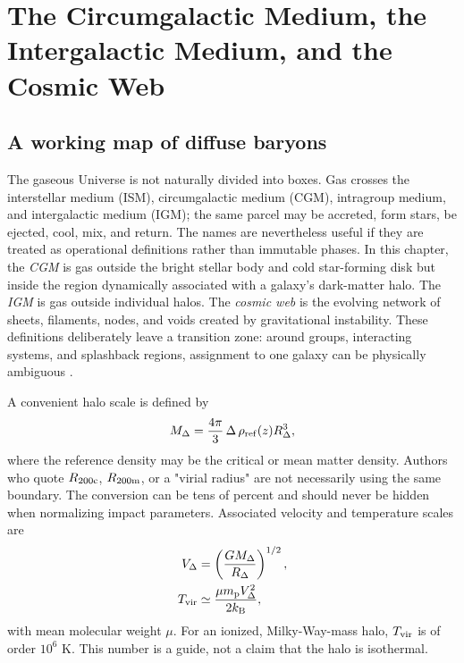 \chapter{The Circumgalactic Medium, the Intergalactic Medium, and the Cosmic Web}
\label{chap:cgm-igm}

\section{A working map of diffuse baryons}

The gaseous Universe is not naturally divided into boxes. Gas crosses the
interstellar medium (ISM), circumgalactic medium (CGM), intragroup medium, and
intergalactic medium (IGM); the same parcel may be accreted, form stars, be
ejected, cool, mix, and return. The names are nevertheless useful if they are
treated as operational definitions rather than immutable phases. In this
chapter, the \emph{CGM} is gas outside the bright stellar body and cold
star-forming disk but inside the region dynamically associated with a galaxy's
dark-matter halo. The \emph{IGM} is gas outside individual halos. The
\emph{cosmic web} is the evolving network of sheets, filaments, nodes, and
voids created by gravitational instability. These definitions deliberately
leave a transition zone: around groups, interacting systems, and splashback
regions, assignment to one galaxy can be physically ambiguous
\citep{Tumlinson2017,FaucherGiguereOh2023}.

A convenient halo scale is defined by
\begin{equation}
 M_{\Delta}=\frac{4\pi}{3}\,\Delta\,\rho_{\rm ref}(z)R_{\Delta}^{3},
 \label{eq:halo-definition}
\end{equation}
where the reference density may be the critical or mean matter density.
Authors who quote $R_{200\rm c}$, $R_{200\rm m}$, or a "virial radius" are
not necessarily using the same boundary. The conversion can be tens of
percent and should never be hidden when normalizing impact parameters.
Associated velocity and temperature scales are
\begin{align}
 V_{\Delta} &= \left(\frac{GM_{\Delta}}{R_{\Delta}}\right)^{1/2},\\
 T_{\rm vir} &\simeq \frac{\mu m_{\rm p}V_{\Delta}^{2}}{2k_{\rm B}},
 \label{eq:tvir}
\end{align}
with mean molecular weight $\mu$. For an ionized, Milky-Way-mass halo,
$T_{\rm vir}$ is of order $10^{6}$ K. This number is a guide, not a claim
that the halo is isothermal.

